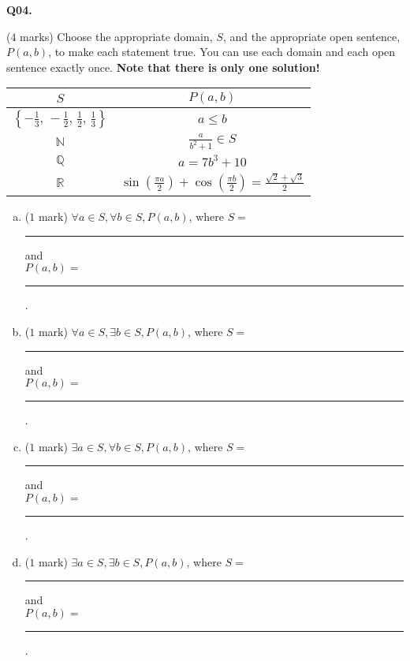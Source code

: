 \documentclass[11pt]{article}
\begin{document}
\textbf{Q04.}

($4$ marks) Choose the appropriate domain, $S$, and the appropriate open sentence, $P(a, b)$, to make each statement true. You can use each domain and each open sentence exactly once. \textbf{Note that there is only one solution!}
 	\begin{center}\begin{tabular}{|c|c|}
 	\hline \text{Domain,} $S$ & \text{Open sentence,} $P(a, b)$\\ \hline 
 	 $\left\{-\frac{1}{3},\, -\frac{1}{2},\, \frac{1}{2},\, \frac{1}{3}\right\}$ &  $a \leq b$ \\ \hline
	 $\mathbb N$ &  $\frac{a}{b^2 + 1} \in S$ \\ \hline
	$\mathbb Q$ & $a = 7b^3 + 10$\\ \hline
	$\mathbb R$ & $\sin\left(\frac{\pi a}{2}\right) + \cos\left(\frac{\pi b}{2}\right) = \frac{\sqrt 2 + \sqrt 3}{2}$ \\ \hline 	 
 	\end{tabular}\end{center}\vspace{0.2cm}
 	
 		\begin{enumerate}[(a)]
			\item ($1$ mark) $\forall a \in S, \forall b \in S, P(a, b)$, where $S=$ \rule{2cm}{0.1mm} and\\$P(a, b)=$  \rule{5cm}{0.1mm}.\vspace{3mm}


			\item ($1$ mark) $\forall a \in S, \exists b \in S, P(a, b)$, where $S=$ \rule{2cm}{0.1mm} and\\$P(a, b)=$  \rule{5cm}{0.1mm}.\vspace{3mm}
		
			\item ($1$ mark) $\exists a \in S, \forall b \in S, P(a, b)$, where $S=$ \rule{2cm}{0.1mm} and\\$P(a, b)=$  \rule{5cm}{0.1mm}.\vspace{3mm}

	
			\item ($1$ mark) $\exists a \in S, \exists b \in S, P(a, b)$, where $S=$ \rule{2cm}{0.1mm} and\\$P(a, b)=$  \rule{5cm}{0.1mm}.\vspace{3mm}
 		\end{enumerate}
\end{document}
